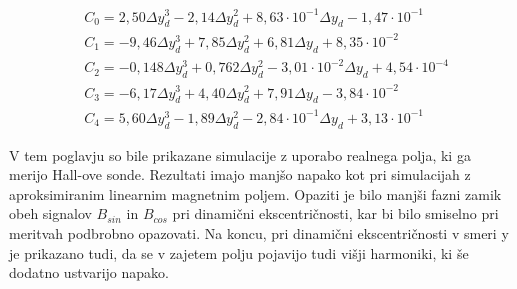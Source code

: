 \begin{eqnarray}
&C_0 =2,50\Delta y_d^{3}-2,14\Delta y_d^{2}+8,63\cdot 10^{-1}\Delta y_d-1,47\cdot 10^{-1}\\                           
&C_1 =-9,46\Delta y_d^{3}+7,85\Delta y_d^{2}+6,81\Delta y_d+8,35\cdot 10^{-2} \\                                       
&C_2 =-0,148\Delta y_d^{3}+0,762\Delta y_d^{2}-3,01\cdot 10^{-2}\Delta y_d+4,54\cdot 10^{-4} \\
&C_3 =-6,17\Delta y_d^{3}+4,40\Delta y_d^{2}+7,91\Delta y_d-3,84\cdot 10^{-2} \\                                       
&C_4 =5,60\Delta y_d^{3}-1,89\Delta y_d^{2}-2,84\cdot 10^{-1}\Delta y_d+3,13\cdot 10^{-1}       
\end{eqnarray}

V tem poglavju so bile prikazane simulacije z uporabo realnega polja, ki ga merijo Hall-ove sonde. Rezultati imajo manjšo napako kot pri simulacijah z aproksimiranim linearnim magnetnim poljem. Opaziti je bilo manjši fazni zamik obeh signalov $B_{sin}$ in $B_{cos}$ pri dinamični ekscentričnosti, kar bi bilo smiselno pri meritvah podbrobno opazovati. Na koncu, pri dinamični ekscentričnosti v smeri y je prikazano tudi, da se v zajetem polju pojavijo tudi višji harmoniki, ki še dodatno ustvarijo napako.





